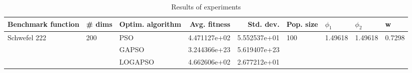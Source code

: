 \begin{table}
\centering
\caption{Results of experiments}
\begin{tabular}{lllrrllll}
\toprule
           Benchmark function &              \# dims & Optim. algorithm &  Avg. fitness &    Std. dev. &            Pop. size &               $\phi_{1}$ &               $\phi_{2}$ &                       w \\
\midrule
\multirow{3}{*}{Schwefel 222} & \multirow{3}{*}{200} &              PSO &  4.471127e+02 & 5.552537e+01 & \multirow{3}{*}{100} & \multirow{3}{*}{1.49618} & \multirow{3}{*}{1.49618} & \multirow{3}{*}{0.7298} \\
                              &                      &            GAPSO &  3.244366e+23 & 5.619407e+23 &                      &                          &                          &                         \\
                              &                      &          LOGAPSO &  4.662606e+02 & 2.677212e+01 &                      &                          &                          &                         \\
\bottomrule
\end{tabular}
\end{table}
